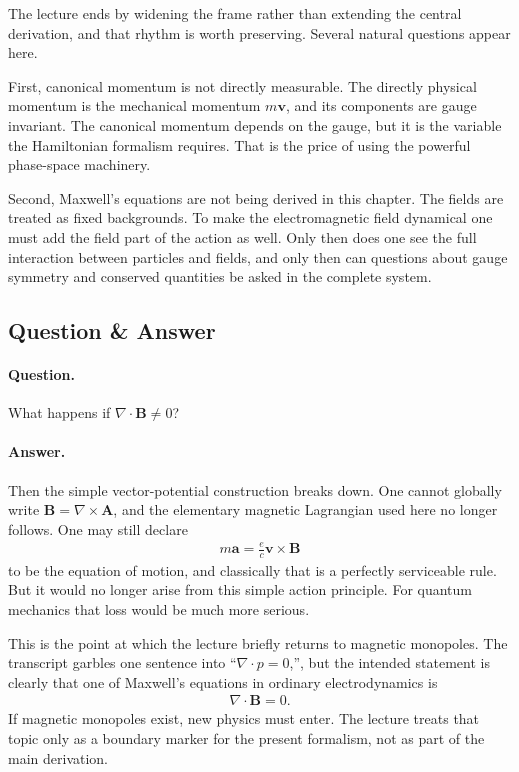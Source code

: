 The lecture ends by widening the frame rather than extending the central derivation, and that rhythm is worth preserving. Several natural questions appear here.

First, canonical momentum is not directly measurable. The directly physical momentum is the mechanical momentum \(m\mathbf v\), and its components are gauge invariant. The canonical momentum depends on the gauge, but it is the variable the Hamiltonian formalism requires. That is the price of using the powerful phase-space machinery.

Second, Maxwell's equations are not being derived in this chapter. The fields are treated as fixed backgrounds. To make the electromagnetic field dynamical one must add the field part of the action as well. Only then does one see the full interaction between particles and fields, and only then can questions about gauge symmetry and conserved quantities be asked in the complete system.

\subsection{Question \& Answer}

\paragraph{Question.} What happens if \(\nabla\!\cdot\!\mathbf B\neq 0\)?

\paragraph{Answer.} Then the simple vector-potential construction breaks down. One cannot globally write \(\mathbf B=\nabla\times\mathbf A\), and the elementary magnetic Lagrangian used here no longer follows. One may still declare
\begin{align}
m\mathbf a=\frac{e}{c}\mathbf v\times\mathbf B
\end{align}
to be the equation of motion, and classically that is a perfectly serviceable rule. But it would no longer arise from this simple action principle. For quantum mechanics that loss would be much more serious.

This is the point at which the lecture briefly returns to magnetic monopoles. The transcript garbles one sentence into ``\(\nabla\!\cdot p=0\),'', but the intended statement is clearly that one of Maxwell's equations in ordinary electrodynamics is
\begin{align}
\nabla\!\cdot\!\mathbf B=0.
\end{align}
If magnetic monopoles exist, new physics must enter. The lecture treats that topic only as a boundary marker for the present formalism, not as part of the main derivation.

